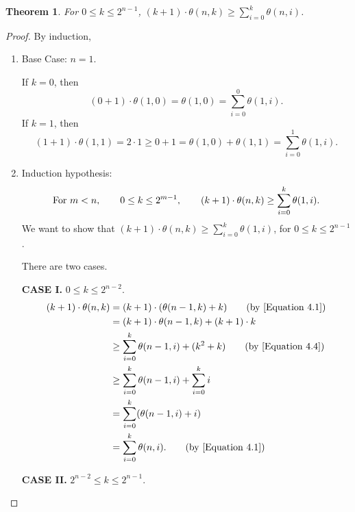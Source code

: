 \documentclass[12pt]{ucthesis}
\theoremstyle{plain}
\newtheorem{theorem}{Theorem}
\theoremstyle{definition}
\begin{document}
\begin{theorem}
\label{Theorem 2}
For $0 \le k \le 2^{n - 1}$,
$(k + 1) \cdot \theta(n, k) \ge \sum_{i = 0}^k \theta(n, i)$.
\end{theorem}
\begin{proof}
By induction,
\begin{enumerate}[(1)]
\item Base Case: $n = 1$.

	If $k = 0$, then
	\begin{equation*}
	(0 + 1) \cdot \theta(1, 0) = \theta(1, 0) = \sum_{i = 0}^0 \theta(1, i).
	\end{equation*}
	If $k = 1$, then
	\begin{equation*}
	(1 + 1) \cdot \theta(1, 1) = 2 \cdot 1 \ge
	0 + 1 = \theta(1, 0) + \theta(1, 1) = \sum_{i = 0}^1 \theta(1, i).
	\end{equation*}
\item Induction hypothesis:
	\begin{equation}
	\label{Equation 4.4}
	\textnormal{For } m < n, \qquad 0 \le k \le 2^{m - 1}, \qquad
	(k + 1) \cdot \theta(n, k) \ge \sum_{i = 0}^k \theta(1, i).
	\end{equation}
	We want to show that $(k + 1) \cdot \theta(n, k) \ge \sum_{i = 0}^k \theta(1, i)$,
	for $0 \le k \le 2^{n - 1}$.

	There are two cases.

	\textbf{CASE I.} $0 \le k \le 2^{n - 2}$.
	\begin{align*}
	(k + 1) \cdot \theta(n, k)
	& = (k + 1) \cdot (\theta(n - 1, k) + k) \tag{by \ref{Equation 4.1}} \\
	& = (k + 1) \cdot \theta(n - 1, k) + (k + 1) \cdot k \\
	& \ge \sum_{i = 0}^k \theta(n - 1, i) + (k^2 + k) \tag{by \ref{Equation 4.4}} \\
	& \ge \sum_{i = 0}^k \theta(n - 1, i) + \sum_{i = 0}^k i \\
	& = \sum_{i = 0}^k (\theta(n - 1, i) + i) \\
	& = \sum_{i = 0}^k \theta(n, i). \tag{by \ref{Equation 4.1}}
	\end{align*}

	\textbf{CASE II.} $2^{n - 2} \le k \le 2^{n - 1}$.


\end{enumerate}
\end{proof}
\end{document}
